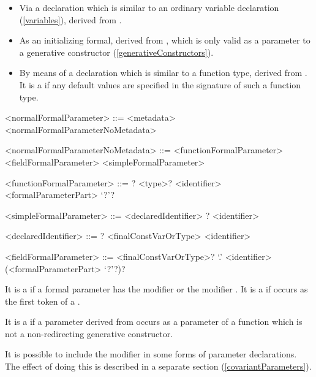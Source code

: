 \documentclass[makeidx]{article}
\begin{document}
\begin{itemize}
\item
  Via a declaration which is similar to an ordinary variable declaration
  (\ref{variables}),
  derived from .
\item
  As an initializing formal, derived from ,
  which is only valid as a parameter to a generative constructor
  (\ref{generativeConstructors}).
\item
  By means of a declaration which is similar to a function type,
  derived from .
  It is a  if any default values are specified
  in the signature of such a function type.
\end{itemize}

\begin{grammar}
<normalFormalParameter> ::= \gnewline{}
  <metadata> <normalFormalParameterNoMetadata>

<normalFormalParameterNoMetadata> ::= <functionFormalParameter>
  \alt <fieldFormalParameter>
  \alt <simpleFormalParameter>

<functionFormalParameter> ::= \gnewline{}
  \COVARIANT? <type>? <identifier> <formalParameterPart> `?'?

<simpleFormalParameter> ::= <declaredIdentifier>
  \alt \COVARIANT? <identifier>

<declaredIdentifier> ::= \COVARIANT? <finalConstVarOrType> <identifier>

<fieldFormalParameter> ::= \gnewline{}
  <finalConstVarOrType>? \THIS{} `.' <identifier> (<formalParameterPart> `?'?)?
\end{grammar}

\LMHash{}%
It is a  if a formal parameter has
the modifier \CONST{} or the modifier \LATE.
It is a  if \VAR{} occurs as
the first token of a .

\LMHash{}%
It is a  if a parameter derived from
 occurs as a parameter of a function
which is not a non-redirecting generative constructor.


\LMHash{}%
It is possible to include the modifier \COVARIANT{}
in some forms of parameter declarations.
The effect of doing this is described in a separate section
(\ref{covariantParameters}).
\end{document}
